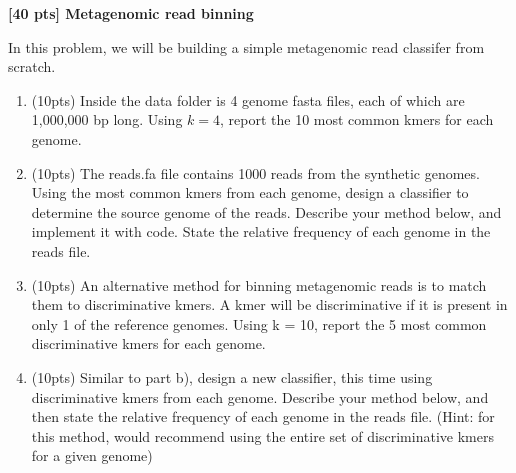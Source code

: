 {\bf [40 pts] Metagenomic read binning}

In this problem, we will be building a simple metagenomic read classifer from scratch.

\begin{enumerate}[label=(\alph*)]
    \item (10pts)  Inside the data folder is 4 genome fasta files, each of which are 1,000,000 bp long. Using $k=4$, report the 10 most common kmers for each genome.
    \begin{solution}


    \end{solution}
    \item (10pts) The reads.fa file contains 1000 reads from the synthetic genomes. Using the most common kmers from each genome, design a classifier to determine the source genome of the reads. Describe your method below, and implement it with code. State the relative frequency of each genome in the reads file.
    \begin{solution}

    \end{solution}   

    \item (10pts) An alternative method for binning metagenomic reads is to match them to discriminative kmers. A kmer will be discriminative if it is present in only 1 of the reference genomes. Using k = 10, report the 5 most common discriminative kmers for each genome.
    \begin{solution}

    \end{solution}   

    \item (10pts) Similar to part b), design a new classifier, this time using discriminative kmers from each genome. Describe your method below, and then state the relative frequency of each genome in the reads file. (Hint: for this method, would recommend using the entire set of discriminative kmers for a given genome)
    \begin{solution}

    \end{solution}   

\end{enumerate}





